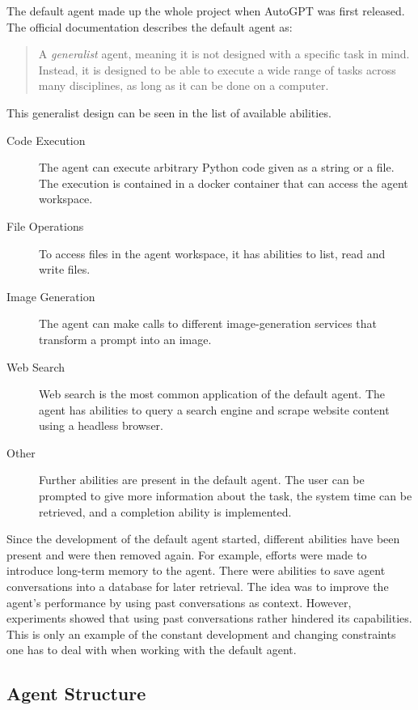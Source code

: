 \documentclass[../main.tex]{subfiles}
\begin{document}
The default agent made up the whole project when AutoGPT was first released.
The official documentation \autocite{zotero-189} describes the default agent as:
\begin{quote}
    A \emph{generalist} agent, meaning it is not designed with a specific task in mind.
    Instead, it is designed to be able to execute a wide range of tasks across many disciplines,
    as long as it can be done on a computer.
\end{quote}
This generalist design can be seen in the list of available abilities.
\begin{description}
    \item[Code Execution] The agent can execute arbitrary Python code given as a
        string or a file.
        The execution is contained in a docker container
        that can access the agent workspace.
    \item[File Operations] To access files in the agent workspace,
        it has abilities to list, read and write files.
    \item[Image Generation]
        The agent can make calls to different image-generation services
        that transform a prompt into an image.
    \item[Web Search]
        Web search is the most common application of the default agent.
        The agent has abilities to query a search engine
        and scrape website content using a headless browser.
    \item[Other]
        Further abilities are present in the default agent.
        The user can be prompted to give more information about the task,
        the system time can be retrieved, and a completion ability is implemented.
\end{description}
Since the development of the default agent started,
different abilities have been present and were then removed again.
For example, efforts were made to introduce long-term memory to the agent.
There were abilities to save agent conversations into a database for later retrieval.
The idea was to improve the agent's performance by using past conversations as context.
However, experiments showed that using past conversations rather hindered its capabilities. %
This is only an example of the constant development and changing constraints
one has to deal with when working with the default agent.

\subsection{Agent Structure}
\end{document}
